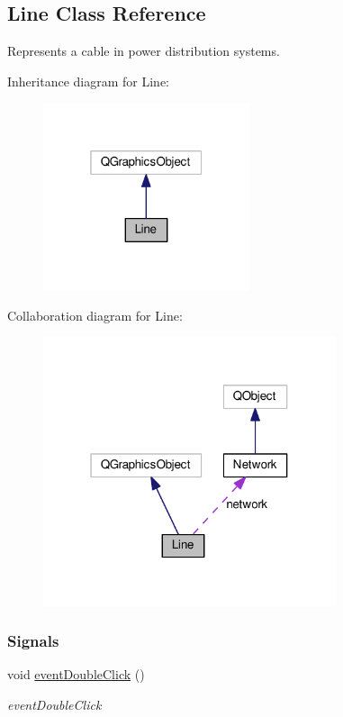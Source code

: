 \hypertarget{class_line}{}\subsection{Line Class Reference}
\label{class_line}


Represents a cable in power distribution systems.  




Inheritance diagram for Line\+:\nopagebreak
\begin{figure}[H]
\begin{center}
\leavevmode
\includegraphics[width=172pt]{class_line__inherit__graph}
\end{center}
\end{figure}


Collaboration diagram for Line\+:\nopagebreak
\begin{figure}[H]
\begin{center}
\leavevmode
\includegraphics[width=244pt]{class_line__coll__graph}
\end{center}
\end{figure}
\subsubsection*{Signals}
\begin{DoxyCompactItemize}
\item 
void \hyperlink{class_line_a2444b577ea2254994599c6f829c629a5}{event\+Double\+Click} ()
\begin{DoxyCompactList}\small\item\em event\+Double\+Click \end{DoxyCompactList}\end{DoxyCompactItemize}
